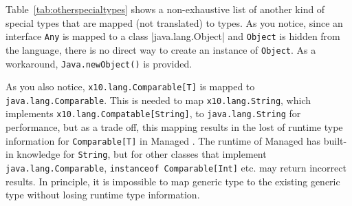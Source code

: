 Table~\ref{tab:otherspecialtypes} shows a non-exhaustive list of
another kind of special types that are mapped (not translated) to \Java{}
types.  As you notice, since an interface \verb|Any| is mapped to a
class |java.lang.Object| and \verb|Object| is hidden from the
language, there is no direct way to create an instance of
\verb|Object|. As a workaround, \verb|Java.newObject()| is provided.

As you also notice, \verb|x10.lang.Comparable[T]| is mapped to \verb|java.lang.Comparable|.
This is needed to map \verb|x10.lang.String|, which implements \verb|x10.lang.Compatable[String]|, to \verb|java.lang.String| for performance, but as a trade off, this mapping results in the lost of runtime type information for \verb|Comparable[T]| in Managed \Xten{}.
The runtime of Managed \Xten{} has built-in knowledge for \verb|String|, but for other \Java{} classes that implement \verb|java.lang.Comparable|, \verb|instanceof Comparable[Int]| etc. may return incorrect results.
In principle, it is impossible to map \Xten{} generic type to the existing \Java{} generic type without losing runtime type information.

